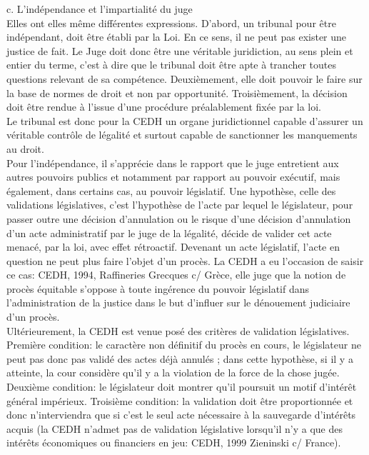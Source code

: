 \documentclass[10pt, a4paper, openany]{book}
\begin{document}
c. L'indépendance et l'impartialité du juge \\
Elles ont elles même différentes expressions. D'abord, un tribunal pour être indépendant, doit être établi par la Loi. En ce sens, il ne peut pas exister une justice  de fait. Le Juge doit donc être une véritable juridiction, au sens plein et entier du terme, c'est à dire que le tribunal doit être apte à trancher toutes questions relevant de sa compétence. Deuxièmement, elle doit pouvoir le faire sur la base de normes de droit et non par opportunité. Troisièmement, la décision doit être rendue à l'issue d'une procédure préalablement fixée par la loi. \\
Le tribunal est donc pour la CEDH un organe juridictionnel capable d'assurer un véritable contrôle de légalité et surtout capable de sanctionner les manquements au droit. \\
Pour l'indépendance, il s'apprécie dans le rapport que le juge entretient aux autres pouvoirs publics et notamment par rapport au pouvoir exécutif, mais également, dans certains cas, au pouvoir législatif. Une hypothèse, celle des validations législatives, c'est l'hypothèse de l'acte par lequel le législateur, pour passer outre une décision d'annulation ou le risque d'une décision d'annulation d'un acte administratif par le juge de la légalité, décide de valider cet acte menacé, par la loi, avec effet rétroactif. Devenant un acte législatif, l'acte en question ne peut plus faire l'objet d'un procès. La CEDH a eu l'occasion de saisir ce cas: CEDH, 1994, Raffineries Grecques c/ Grèce, elle juge que la notion de procès équitable s'oppose à toute ingérence du pouvoir législatif dans l'administration de la justice dans le but d'influer sur le dénouement judiciaire d'un procès. \\
Ultérieurement, la CEDH est venue posé des critères de validation législatives. Première condition: le caractère non définitif du procès en cours, le législateur ne peut pas donc pas validé des actes déjà annulés ; dans cette hypothèse, si il y a atteinte, la cour considère qu'il y a la violation de la force de la chose jugée. Deuxième condition: le législateur doit montrer qu'il poursuit un motif d'intérêt général impérieux. Troisième condition: la validation doit être proportionnée et donc n'interviendra que si c'est le seul acte nécessaire à la sauvegarde d'intérêts acquis (la CEDH n'admet pas de validation législative lorsqu'il n'y a que des intérêts économiques ou financiers en jeu: CEDH, 1999 Zieninski c/ France). \\
\end{document}
